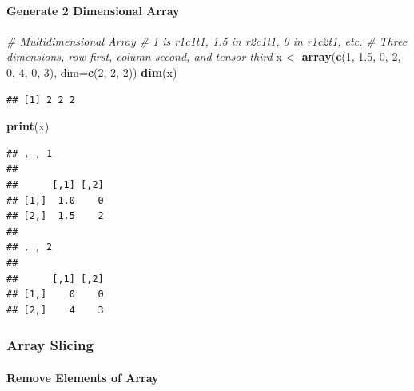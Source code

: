 \documentclass[
]{book}
\newenvironment{Shaded}{\begin{snugshade}}{\end{snugshade}}
\newcommand{\CommentTok}[1]{\textcolor[rgb]{0.56,0.35,0.01}{\textit{#1}}}
\newcommand{\DataTypeTok}[1]{\textcolor[rgb]{0.13,0.29,0.53}{#1}}
\newcommand{\DecValTok}[1]{\textcolor[rgb]{0.00,0.00,0.81}{#1}}
\newcommand{\FloatTok}[1]{\textcolor[rgb]{0.00,0.00,0.81}{#1}}
\newcommand{\KeywordTok}[1]{\textcolor[rgb]{0.13,0.29,0.53}{\textbf{#1}}}
\newcommand{\NormalTok}[1]{#1}
\newcommand{\StringTok}[1]{\textcolor[rgb]{0.31,0.60,0.02}{#1}}
\begin{document}
\hypertarget{generate-2-dimensional-array}{%
\paragraph{Generate 2 Dimensional Array}\label{generate-2-dimensional-array}}

\begin{Shaded}
\begin{Highlighting}[]
\CommentTok{\# Multidimensional Array}
\CommentTok{\# 1 is r1c1t1, 1.5 in r2c1t1, 0 in r1c2t1, etc.}
\CommentTok{\# Three dimensions, row first, column second, and tensor third}
\NormalTok{x \textless{}{-}}\StringTok{ }\KeywordTok{array}\NormalTok{(}\KeywordTok{c}\NormalTok{(}\DecValTok{1}\NormalTok{, }\FloatTok{1.5}\NormalTok{, }\DecValTok{0}\NormalTok{, }\DecValTok{2}\NormalTok{, }\DecValTok{0}\NormalTok{, }\DecValTok{4}\NormalTok{, }\DecValTok{0}\NormalTok{, }\DecValTok{3}\NormalTok{), }\DataTypeTok{dim=}\KeywordTok{c}\NormalTok{(}\DecValTok{2}\NormalTok{, }\DecValTok{2}\NormalTok{, }\DecValTok{2}\NormalTok{))}
\KeywordTok{dim}\NormalTok{(x)}
\end{Highlighting}
\end{Shaded}

\begin{verbatim}
## [1] 2 2 2
\end{verbatim}

\begin{Shaded}
\begin{Highlighting}[]
\KeywordTok{print}\NormalTok{(x)}
\end{Highlighting}
\end{Shaded}

\begin{verbatim}
## , , 1
## 
##      [,1] [,2]
## [1,]  1.0    0
## [2,]  1.5    2
## 
## , , 2
## 
##      [,1] [,2]
## [1,]    0    0
## [2,]    4    3
\end{verbatim}

\hypertarget{array-slicing}{%
\subsubsection{Array Slicing}\label{array-slicing}}

\hypertarget{remove-elements-of-array}{%
\paragraph{Remove Elements of Array}\label{remove-elements-of-array}}
\end{document}
